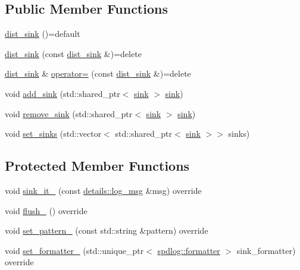 \subsection*{Public Member Functions}
\begin{DoxyCompactItemize}
\item 
\hyperlink{classspdlog_1_1sinks_1_1dist__sink_ab5cfe7f044b6381435eac6dc273384e5}{dist\+\_\+sink} ()=default
\item 
\hyperlink{classspdlog_1_1sinks_1_1dist__sink_afadef20aeb435c8b62b2efa2f0906de5}{dist\+\_\+sink} (const \hyperlink{classspdlog_1_1sinks_1_1dist__sink}{dist\+\_\+sink} \&)=delete
\item 
\hyperlink{classspdlog_1_1sinks_1_1dist__sink}{dist\+\_\+sink} \& \hyperlink{classspdlog_1_1sinks_1_1dist__sink_a6f91b5522c12fd448ca2fd7cb8fe0097}{operator=} (const \hyperlink{classspdlog_1_1sinks_1_1dist__sink}{dist\+\_\+sink} \&)=delete
\item 
void \hyperlink{classspdlog_1_1sinks_1_1dist__sink_ae2250f59f23ecaf3214da6059198ad3c}{add\+\_\+sink} (std\+::shared\+\_\+ptr$<$ \hyperlink{classspdlog_1_1sinks_1_1sink}{sink} $>$ \hyperlink{classspdlog_1_1sinks_1_1sink}{sink})
\item 
void \hyperlink{classspdlog_1_1sinks_1_1dist__sink_ac1537fdc6225fd57cc819e1fb9c5f8c7}{remove\+\_\+sink} (std\+::shared\+\_\+ptr$<$ \hyperlink{classspdlog_1_1sinks_1_1sink}{sink} $>$ \hyperlink{classspdlog_1_1sinks_1_1sink}{sink})
\item 
void \hyperlink{classspdlog_1_1sinks_1_1dist__sink_aa0e154cef03e368fefaa7bc845d682a1}{set\+\_\+sinks} (std\+::vector$<$ std\+::shared\+\_\+ptr$<$ \hyperlink{classspdlog_1_1sinks_1_1sink}{sink} $>$$>$ sinks)
\end{DoxyCompactItemize}
\subsection*{Protected Member Functions}
\begin{DoxyCompactItemize}
\item 
void \hyperlink{classspdlog_1_1sinks_1_1dist__sink_a516ef929a8cd73df2ead2e0086e04607}{sink\+\_\+it\+\_\+} (const \hyperlink{structspdlog_1_1details_1_1log__msg}{details\+::log\+\_\+msg} \&msg) override
\item 
void \hyperlink{classspdlog_1_1sinks_1_1dist__sink_a790a80f63276473cedbce99047adcab0}{flush\+\_\+} () override
\item 
void \hyperlink{classspdlog_1_1sinks_1_1dist__sink_a6f77a1e2f45ed85ee8ed554cf7442d4e}{set\+\_\+pattern\+\_\+} (const std\+::string \&pattern) override
\item 
void \hyperlink{classspdlog_1_1sinks_1_1dist__sink_a5e83e285fcceaab7ee4c4736c2decef0}{set\+\_\+formatter\+\_\+} (std\+::unique\+\_\+ptr$<$ \hyperlink{classspdlog_1_1formatter}{spdlog\+::formatter} $>$ sink\+\_\+formatter) override
\end{DoxyCompactItemize}
